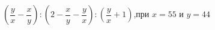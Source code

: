 \begin{ex}[type=calculate_expression]
	\begin{condition}
		\( \left( \dfrac{y}{x}-\dfrac{x}{y} \right):\left( 2-\dfrac{x}{y}-\dfrac{y}{x} \right):\left( \dfrac{y}{x}+1 \right) \),\quad при \( x=55 \) и \( y=44 \)
	\end{condition}
\end{ex}